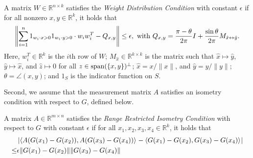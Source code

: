 \begin{definition} \label{GA:df1}
A matrix $W \in \mathbb{R}^{n \times k}$ satisfies the \emph{Weight Distribution Condition} with constant $\epsilon$ if for all nonzero $x, y \in \mathbb{R}^k$, it holds that
\begin{equation*}
\left\| \sum_{i = 1}^n 1_{w_i \cdot x > 0} 1_{w_i \cdot y > 0} \cdot w_i w_i^T - Q_{x, y} \right\| \leq \epsilon, \hbox{ with } Q_{x, y} = \frac{\pi - \theta}{2 \pi} I + \frac{\sin \theta}{2 \pi} M_{\hat{x} \leftrightarrow \hat{y}}.
\end{equation*}
Here, $w_i^T \in \mathbb{R}^k$ is the $i$th row of $W$; $M_{\hat{x}} \in \mathbb{R}^{k \times k}$ is the matrix such that $\hat{x} \mapsto \hat{y}$, $\hat{y} \mapsto \hat{x}$, and $\hat{z} \mapsto 0$ for all $z \in \sspan(\{x, y\})^\perp$; $\hat{x} = x / \|x\|$, and $\hat{y} = y / \|y\|$; $\theta = \angle(x, y)$; and $1_S$ is the indicator function on $S$.
\end{definition}


Second, we assume that the measurement matrix $A$ satisfies an isometry condition with respect to $G$, defined below.

\begin{definition} \label{GA:df2}
A matrix $A \in \mathbb{R}^{m \times n}$ satisfies the \emph{Range Restricted Isometry Condition} with respect to $G$ with constant $\epsilon$ if for all $x_1, x_2, x_3, x_4 \in \mathbb{R}^k$, it holds that
\begin{align*}
&\left| \inner[]{A(G(x_1) - G(x_2))}{A(G(x_3) - G(x_4))} - \inner[]{G(x_1) - G(x_2)}{G(x_3) - G(x_4)}\right| \\
\leq& \epsilon \|G(x_1) - G(x_2)\| \|G(x_3) - G(x_4)\|
\end{align*}
\end{definition}


